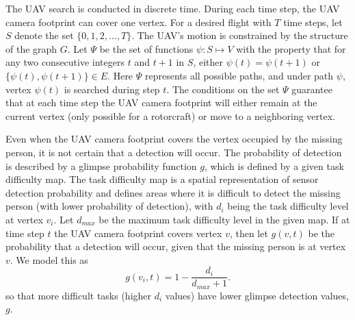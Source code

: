 \documentclass[journal]{IEEEtran}
\begin{document}
The UAV search is conducted in discrete time. During each time step, the UAV camera footprint can cover one vertex. For a desired flight with $T$ time steps, let $S$ denote the set $\{0,1,2,...,T\}$. The UAV's motion is constrained by the structure of the graph $G$. Let $\Psi$ be the set of functions $\psi:S \mapsto V$ with the property that for any two consecutive integers $t$ and $t+1$ in $S$, either $\psi(t)=\psi(t+1)$ or $\{\psi(t),\psi(t+1)\}\in E$. Here $\Psi$ represents all possible paths, and under path $\psi$, vertex $\psi(t)$ is searched during step $t$. The conditions on the set $\Psi$ guarantee that at each time step the UAV camera footprint will either remain at the current vertex (only possible for a rotorcraft) or move to a neighboring vertex.

Even when the UAV camera footprint covers the vertex occupied by the missing person, it is not certain that a detection will occur. The probability of detection is described by a glimpse probability function $g$, which is defined by a given task difficulty map. The task difficulty map is a spatial representation of sensor detection probability and defines areas where it is difficult to detect the missing person (with lower probability of detection), with $d_i$ being the task difficulty level at vertex $v_i$. Let $d_{max}$ be the maximum task difficulty level in the given map. If at time step $t$ the UAV camera footprint covers vertex $v$, then let $g(v,t)$ be the probability that a detection will occur, given that the missing person is at vertex $v$. We model this as
\begin{equation}
g(v_i,t) = 1 - \frac{d_i}{d_{max}+1}.
\label{g}
\end{equation}
so that more difficult tasks (higher $d_i$ values) have lower glimpse detection values, $g$.
\end{document}

